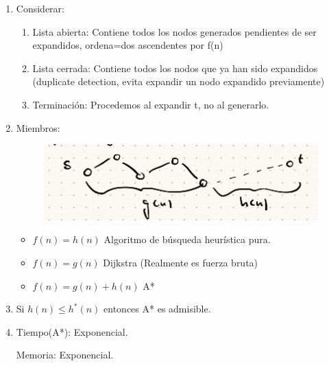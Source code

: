 \documentclass[12pt, twoside, openright]{report} %
\begin{document}
  \begin{enumerate}
  \item
    Considerar:

    \begin{enumerate}
  
    \item
      Lista abierta: Contiene todos los nodos generados pendientes de
      ser expandidos, ordena=dos ascendentes por f(n)
    \item
      Lista cerrada: Contiene todos los nodos que ya han sido expandidos
      (duplicate detection, evita expandir un nodo expandido
      previamente)
    \item
      Terminación: Procedemos al expandir t, no al generarlo.
    \end{enumerate}
  \item
    Miembros:
	\begin{figure}[H]
		{\includegraphics[scale=.45]{Untitled 55.png}}
	\end{figure}
    \begin{itemize}
  
    \item
      \(f(n)=h(n)\) Algoritmo de búsqueda heurística pura.
    \item
      \(f(n)=g(n)\) Dijkstra (Realmente es fuerza bruta)
    \item
      \(f(n) = g(n) + h(n)\) A*
    \end{itemize}
  \item
    Si \(h(n) \leq h^*(n)\) entonces A* es admisible.
  \item
    Tiempo(A*): Exponencial.

    Memoria: Exponencial.


\end{enumerate}
\end{document}
